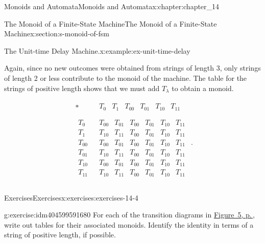 \documentclass[twoside,10pt,]{book}
\numberwithin{equation}{section}
\begin{document}
\begin{chapterptx}{Monoids and Automata}{}{Monoids and Automata}{}{}{x:chapter:chapter_14}
\begin{sectionptx}{The Monoid of a Finite-State Machine}{}{The Monoid of a Finite-State Machine}{}{}{x:section:s-monoid-of-fsm}
\begin{example}{The Unit-time Delay Machine.}{x:example:ex-unit-time-delay}
\par
Again, since no new outcomes were obtained from strings of length 3, only strings of length 2 or less contribute to the monoid of the machine. The table for the strings of positive length shows that we must add \(T_{\lambda }\) to obtain a monoid.%
\par
%
\begin{equation*}
\begin{array}{c|c}
* & 
\begin{array}{cccccc}
T_0 & T_1  & T_{00} & T_{01} & T_{10} & T_{11} \\
\end{array}
\\
\hline
\begin{array}{c}
T_0 \\
T_1 \\
T_{00} \\
T_{01} \\
T_{10} \\
T_{11} \\
\end{array}
& 
\begin{array}{cccccc}
T_{00} & T_{01} & T_{00} & T_{01} & T_{10} & T_{11} \\
T_{10} & T_{11} & T_{00} & T_{01} & T_{10} & T_{11} \\
T_{00} & T_{01} & T_{00} & T_{01} & T_{10} & T_{11} \\
T_{10} & T_{11} & T_{00} & T_{01} & T_{10} & T_{11} \\
T_{00} & T_{01} & T_{00} & T_{01} & T_{10} & T_{11} \\
T_{10} & T_{11} & T_{00} & T_{01} & T_{10} & T_{11} \\
\end{array}
\\
\end{array}\text{.}
\end{equation*}
%
\end{example}
%
%
\typeout{************************************************}
\typeout{************************************************}
%
\begin{exercises-subsection}{Exercises}{}{Exercises}{}{}{x:exercises:exercises-14-4}
\begin{divisionexercise}{1}{}{}{g:exercise:idm404599591680}%
For each of the transition diagrams in \hyperref[x:figure:fig-exercise-14-4-1]{Figure~5, p.\,\pageref{x:figure:fig-exercise-14-4-1}}, write out tables for their associated monoids. Identify the identity in terms of a string of positive length, if possible.%

\end{divisionexercise}
\end{exercises-subsection}
\end{sectionptx}
\end{chapterptx}
\end{document}
